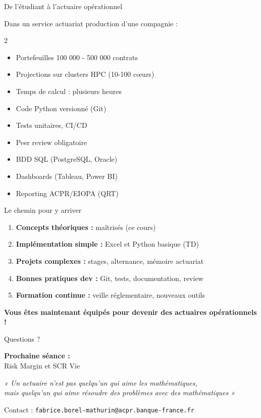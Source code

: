 \documentclass[10pt,aspectratio=169]{beamer}
\begin{document}
\begin{frame}{De l'étudiant à l'actuaire opérationnel}
\begin{block}{Dans un service actuariat production d'une compagnie :}
\begin{multicols}{2}
\begin{itemize}
    \item Portefeuilles 100 000 - 500 000 contrats
    \item Projections sur clusters HPC (10-100 cœurs)
    \item Temps de calcul : plusieurs heures
    \item Code Python versionné (Git)
    \item Tests unitaires, CI/CD
    \item Peer review obligatoire
    \item BDD SQL (PostgreSQL, Oracle)
    \item Dashboards (Tableau, Power BI)
    \item Reporting ACPR/EIOPA (QRT)
\end{itemize}
\end{multicols}
\end{block}

\vspace{0.3cm}
\begin{exampleblock}{Le chemin pour y arriver}
\begin{enumerate}
    \item[$\checkmark$] \textbf{Concepts théoriques :} maîtrisés (ce cours)
    \item[$\checkmark$] \textbf{Implémentation simple :} Excel et Python basique (TD)
    \item[$\rightarrow$] \textbf{Projets complexes :} stages, alternance, mémoire actuariat
    \item[$\rightarrow$] \textbf{Bonnes pratiques dev :} Git, tests, documentation, review
    \item[$\rightarrow$] \textbf{Formation continue :} veille réglementaire, nouveaux outils
\end{enumerate}
\end{exampleblock}

\textbf{Vous êtes maintenant équipés pour devenir des actuaires opérationnels !}
\end{frame}

\begin{frame}[c]  %
\Huge Questions ?

\vspace{1.5cm}

\Large
\textbf{Prochaine séance :}\\
Risk Margin et SCR Vie

\vspace{1cm}

\normalsize
\textit{« Un actuaire n'est pas quelqu'un qui aime les mathématiques, \\
mais quelqu'un qui aime résoudre des problèmes avec des mathématiques »}

\vspace{1.5cm}

Contact : \texttt{fabrice.borel-mathurin@acpr.banque-france.fr}
\end{frame}
\end{document}
